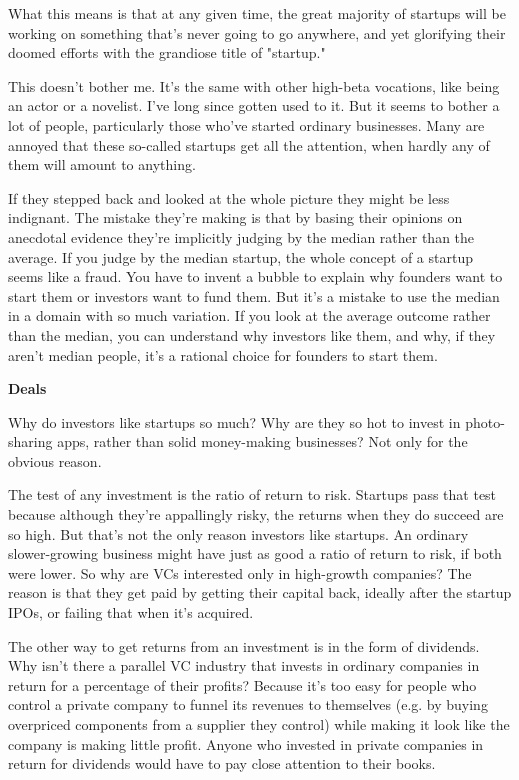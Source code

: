 What this means is that at any given time, the great majority of
startups will be working on something that's never going to go
anywhere, and yet glorifying their doomed efforts with the grandiose
title of "startup."

This doesn't bother me.  It's the same with other high-beta vocations,
like being an actor or a novelist.  I've long since gotten used to
it.  But it seems to bother a lot of people, particularly those
who've started ordinary businesses.  Many are annoyed that these
so-called startups get all the attention, when hardly any of them
will amount to anything.

If they stepped back and looked at the whole picture they might be
less indignant.  The mistake they're making is that by basing their
opinions on anecdotal evidence they're implicitly judging by the
median rather than the average.  If you judge by the median startup,
the whole concept of a startup seems like a fraud.  You have to
invent a bubble to explain why founders want to start them or
investors want to fund them.  But it's a mistake to use the median
in a domain with so much variation.  If you look at the average
outcome rather than the median, you can understand why investors
like them, and why, if they aren't median people, it's a rational
choice for founders to start them.


\textbf{Deals}

Why do investors like startups so much?  Why are they so hot to
invest in photo-sharing apps, rather than solid money-making
businesses?  Not only for the obvious reason.

The test of any investment is the ratio of return to risk.  Startups
pass that test because although they're appallingly risky, the
returns when they do succeed are so high.  But that's not the only
reason investors like startups.  An ordinary slower-growing business
might have just as good a ratio of return to risk, if both were
lower.  So why are VCs interested only in high-growth companies?
The reason is that they get paid by getting their capital back,
ideally after the startup IPOs, or failing that when it's acquired.

The other way to get returns from an investment is in the form of
dividends.  Why isn't there a parallel VC industry that invests in
ordinary companies in return for a percentage of their profits?
Because it's too easy for people who control a private company to
funnel its revenues to themselves (e.g. by buying overpriced
components from a supplier they control) while making it look like
the company is making little profit.  Anyone who invested in private
companies in return for dividends would have to pay close attention
to their books.

